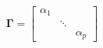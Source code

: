 \documentclass[10pt]{article}
\begin{document}
\[\boldsymbol \Gamma =
  \begin{bmatrix}
    \alpha_{1} & & \\
    & \ddots & \\
    & & \alpha_{p}
  \end{bmatrix}
\]
\end{document}
